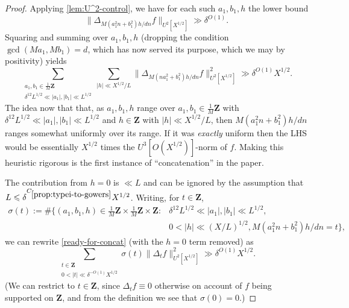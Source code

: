 \documentclass[11pt,reqno]{amsart}
\numberwithin{equation}{section}
\theoremstyle{definition}
\theoremstyle{remark}
\newcommand{\snorm}[1]{\lVert#1\rVert}
\renewcommand{\le}{\leqslant}
\newcommand\Z{\mathbf{Z}}
\begin{document}
\begin{proof}
Applying \cref{lem:U^2-control}, we have for each such $a_1,b_1,h$ the lower bound 
\[\snorm{\Delta_{M(a_1^2n + b_1^2)h/dn}f}_{U^2[X^{1/2}]}\gg \delta^{O(1)}.\]
Squaring and summing over $a_1,b_1, h$ (dropping the condition $\gcd(Ma_1, Mb_1) = d$, which has now served its purpose, which we may by positivity) yields
\begin{equation}\label{ready-for-concat}\sum_{\substack{a_1, b_1 \in \frac{1}{M} \Z \\ \delta^{12} L^{1/2} \ll |a_1|, |b_1| \ll L^{1/2}}}\sum_{|h| \ll X^{1/2}/L}\snorm{\Delta_{M(na_1^2 + b_1^2)h/dn}f}_{U^2[X^{1/2}]}^{2}\gg \delta^{O(1)}X^{1/2}.\end{equation}
The idea now that that, as $a_1, b_1, h$ range over $a_1, b_1 \in \frac{1}{M} \Z$ with $\delta^{12} L^{1/2} \ll |a_1|, |b_1| \ll L^{1/2}$ and $h \in \Z$ with $|h| \ll X^{1/2}/L$, then $M(a_1^2n + b_1^2)h/dn$ ranges somewhat uniformly over its range. If it was \emph{exactly} uniform then the LHS would be essentially $X^{1/2}$ times the $U^3[O(X^{1/2})]$-norm of $f$. Making this heuristic rigorous is the first instance of ``concatenation'' in the paper.


The contribution from $h = 0$ is $\ll L$ and can be ignored by the assumption that $L \le  \delta^{C_{\ref{prop:typei-to-gowers}}}X^{1/2}$. Writing, for $t \in \Z$, 
\begin{align*} \sigma(t) := \#\Big\{ (a_1,b_1,h) \in \frac{1}{M} \Z \times \frac{1}{M} \Z \times \Z : & \delta^{12} L^{1/2} \ll |a_1|, |b_1| \ll L^{1/2},\\ &  0 < |h| \ll (X/L)^{1/2}, M(a_1^2n + b_1^2)h/dn = t\Big\},\end{align*} we can rewrite \cref{ready-for-concat} (with the $h = 0$ term removed) as 
\begin{equation}\label{sigma-version} \sum_{\substack{t \in \Z \\ 0 < |t| \ll \delta^{-O(1)} X^{1/2}}} \sigma(t) \snorm{\Delta_{t}f}_{U^2[X^{1/2}]}^{2} \gg \delta^{O(1)}X^{1/2}.
\end{equation}
(We can restrict to $t \in \Z$, since $\Delta_t f \equiv 0$ otherwise on account of $f$ being supported on $\Z$, and from the definition we see that $\sigma(0) = 0$.)  


\end{proof}
\end{document}
